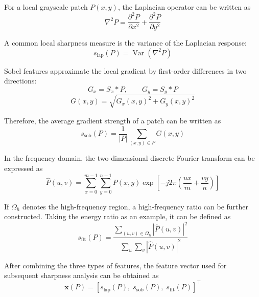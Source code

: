 \par For a local grayscale patch $P(x,y)$, the Laplacian operator can be
written as
\begin{equation}
    \nabla^2 P=\frac{\partial^2 P}{\partial x^2}+\frac{\partial^2 P}{\partial y^2}
    \label{eq:laplacian-basic}
\end{equation}
\par A common local sharpness measure is the variance of the Laplacian response:
\begin{equation}
    s_{\mathrm{lap}}(P)=\operatorname{Var}\!\left(\nabla^2 P\right)
    \label{eq:laplacian-var-basic}
\end{equation}
\par Sobel features approximate the local gradient by first-order differences in
two directions:
\begin{equation}
    G_x=S_x*P,\qquad G_y=S_y*P
    \label{eq:sobel-basic}
\end{equation}
\begin{equation}
    G(x,y)=\sqrt{G_x(x,y)^2+G_y(x,y)^2}
    \label{eq:sobel-magnitude-basic}
\end{equation}
\par Therefore, the average gradient strength of a patch can be written as
\begin{equation}
    s_{\mathrm{sob}}(P)=\frac{1}{|P|}\sum_{(x,y)\in P} G(x,y)
    \label{eq:sobel-score-basic}
\end{equation}
\par In the frequency domain, the two-dimensional discrete Fourier transform can
be expressed as
\begin{equation}
    \hat{P}(u,v)=\sum_{x=0}^{m-1}\sum_{y=0}^{n-1}
    P(x,y)\exp\!\left[-j2\pi\left(\frac{ux}{m}+\frac{vy}{n}\right)\right]
    \label{eq:dft-basic}
\end{equation}
\par If $\Omega_h$ denotes the high-frequency region, a high-frequency ratio can
be further constructed. Taking the energy ratio as an example, it can be
defined as
\begin{equation}
    s_{\mathrm{fft}}(P)=
    \frac{\sum_{(u,v)\in\Omega_h}\left|\hat{P}(u,v)\right|^2}
    {\sum_{u}\sum_{v}\left|\hat{P}(u,v)\right|^2}
    \label{eq:fft-energy-basic}
\end{equation}
\par After combining the three types of features, the feature vector used for
subsequent sharpness analysis can be obtained as
\begin{equation}
    \mathbf{x}(P)=
    \left[s_{\mathrm{lap}}(P),\; s_{\mathrm{sob}}(P),\; s_{\mathrm{fft}}(P)\right]^\top
    \label{eq:feature-vector-basic}
\end{equation}
